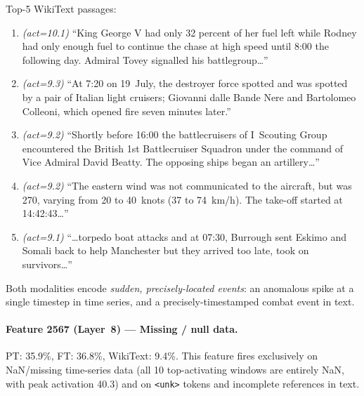 \documentclass{article}
\begin{document}
Top-5 WikiText passages:
\begin{enumerate}[nosep, leftmargin=1.5em]
\item \emph{(act=10.1)} ``King George V had only 32 percent of her fuel left while Rodney had only enough fuel to continue the chase at high speed until 8:00 the following day.  Admiral Tovey signalled his battlegroup\ldots''
\item \emph{(act=9.3)} ``At 7:20 on 19~July, the destroyer force spotted and was spotted by a pair of Italian light cruisers; Giovanni dalle Bande Nere and Bartolomeo Colleoni, which opened fire seven minutes later.''
\item \emph{(act=9.2)} ``Shortly before 16:00 the battlecruisers of I~Scouting Group encountered the British 1st Battlecruiser Squadron under the command of Vice Admiral David Beatty.  The opposing ships began an artillery\ldots''
\item \emph{(act=9.2)} ``The eastern wind was not communicated to the aircraft, but was 270\textdegree, varying from 20 to 40~knots (37 to 74~km/h).  The take-off started at 14:42:43\ldots''
\item \emph{(act=9.1)} ``\ldots torpedo boat attacks and at 07:30, Burrough sent Eskimo and Somali back to help Manchester but they arrived too late, took on survivors\ldots''
\end{enumerate}
Both modalities encode \emph{sudden, precisely-located events}: an anomalous spike at a single timestep in time series, and a precisely-timestamped combat event in text.


\paragraph{Feature 2567 (Layer~8) --- Missing / null data.}
PT: 35.9\%, FT: 36.8\%, WikiText: 9.4\%.  This feature fires exclusively on NaN/missing time-series data (all 10 top-activating windows are entirely NaN, with peak activation 40.3) and on \texttt{<unk>} tokens and incomplete references in text.
\end{document}
